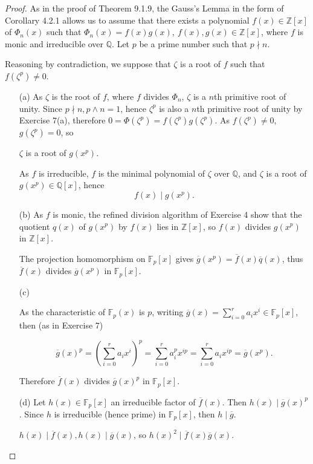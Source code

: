\documentclass[11pt,a4paper]{article}
\newcommand{\Q}{\mathbb{Q}}
\newcommand{\Z}{\mathbb{Z}}
\newcommand{\F}{\mathbb{F}}
\begin{document}
\begin{proof}
 As in the proof of Theorem 9.1.9, the Gauss's Lemma in the form of Corollary 4.2.1 allows us to assume that there exists a polynomial $f(x)\in \Z[x]$ of $\Phi_n(x)$ such that
 $\Phi_n(x) = f(x) g(x),\  f(x),g(x) \in \Z[x]$, where $f$ is monic and irreducible over $\Q$. Let $p$ be a prime number such that $p\nmid n$.

Reasoning by contradiction, we suppose that $\zeta$ is a root of $f$ such that $f(\zeta^p)\neq 0$.
\begin{enumerate}
\item[(a)] As $\zeta$ is the root of $f$, where $f$ divides $\Phi_n$, $\zeta$ is a $n$th primitive root of unity. Since $p\nmid n, p\wedge n=1$, hence $\zeta^p$ is also a $n$th primitive root of unity by Exercise 7(a), therefore $0 = \Phi(\zeta^p) = f(\zeta^p) g(\zeta^p)$. As $f(\zeta^p) \neq 0$, $g(\zeta^p)=0$, so
\begin{center}
$\zeta$ is a root of $g(x^p)$.
\end{center}
As $f$ is irreducible, $f$ is the minimal polynomial of $\zeta$ over $\Q$, and $\zeta$ is a root of $g(x^p) \in \Q[x]$, hence
$$f(x) \mid g(x^p).$$

\item[(b)]
As $f$ is monic, the refined division algorithm of Exercise 4 show that the quotient $q(x)$ of $g(x^p)$ by $f(x)$ lies in $\Z[x]$, so $f(x)$ divides $g(x^p)$ in $\Z[x]$.

The projection homomorphism on $\F_p[x]$  gives $\overline{g}(x^p) = \overline{f}(x) \overline{q}(x)$, thus $\overline{f}(x)$ divides $\overline{g}(x^p)$ in $\F_p[x]$.

\item[(c)]

As the characteristic of $\F_p(x)$ is $p$, writing $\overline{g}(x) = \sum\limits_{i=0}^r a_i x^i \in \F_p[x]$, then (as in Exercise 7)

$$\overline{g}(x)^p =\left( \sum\limits_{i=0}^r a_i x^i\right)^p = \sum\limits_{i=0}^r a_i^p  x^{ip} = \sum\limits_{i=0}^r a_i  x^{ip} = \overline{g}(x^p).$$


Therefore $\overline{f}(x)$ divides $\overline{g}(x)^p$ in $\F_p[x]$.

\item[(d)] Let $h(x)  \in \F_p[x]$ an irreducible factor of $\overline{f}(x)$. Then $h(x) \mid \overline{g}(x)^p$. Since $h$ is irreducible (hence prime) in $\F_p[x]$, then  $h \mid \overline{g}$.

$h(x) \mid \overline{f}(x), h(x) \mid \overline{g}(x)$, so $h(x)^2 \mid \overline{f}(x)\overline{g}(x)$. 


\end{enumerate}
\end{proof}
\end{document}
